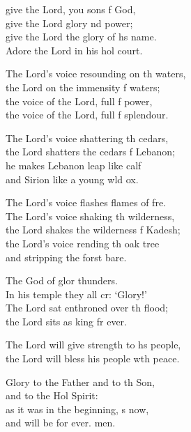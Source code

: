 \settowidth{\versewidth}{The Lord’s voice resounding on the waters, *}
\begin{psalmverse}%
  \begin{patverse}
     give the Lord, you sons f God,\Med\\
    give the Lord glory nd power;\\
give the Lord the glory of h\pointup{\i}s name.\Med\\
    Adore the Lord in his hol court.

The Lord’s voice resounding on th waters,\Med\\
    the Lord on the immensity f waters;\\
the voice of the Lord, full f power,\Med\\
    the voice of the Lord, full f splendour.

The Lord’s voice shattering th cedars,\Med\\
    the Lord shatters the cedars f Lebanon;\\
he makes Lebanon leap like  calf\Med\\
    and Sirion like a young w\pointup{\i}ld ox.

The Lord’s voice flashes flames of f\pointup{\i}re.\Flex\\
    The Lord’s voice shaking th wilderness,\Med\\
    the Lord shakes the wilderness f Kadesh;\\
the Lord’s voice rending th oak tree\Med\\
    and stripping the forst bare.

The God of glor thunders.\Med\\
    In his temple they all cr: ‘Glory!’\\
The Lord sat enthroned over th flood;\Med\\
    the Lord sits as king fr ever.

The Lord will give strength to h\pointup{\i}s people,\Med\\
    the Lord will bless his people w\pointup{\i}th peace.

Glory to the Father and to th Son,\Med\\
    and to the Hol Spirit:\\
as it was in the beginning, \pointup{\i}s now,\Med\\
    and will be for ever. men.
  \end{patverse}
\end{psalmverse}
